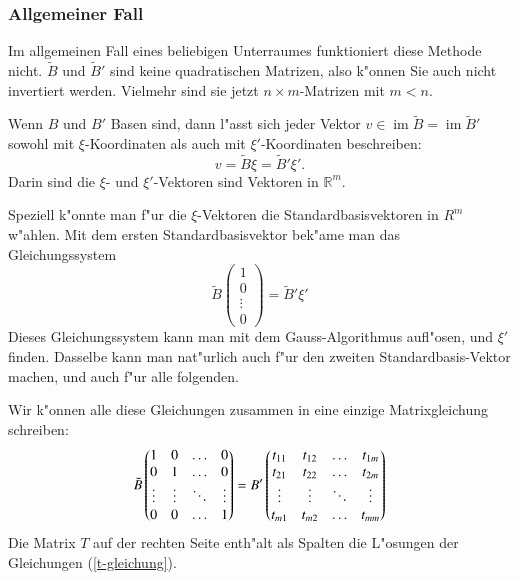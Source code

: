 \subsubsection{Allgemeiner Fall}
Im allgemeinen Fall eines beliebigen Unterraumes funktioniert diese
Methode nicht.
$\tilde B$ und $\tilde B'$ sind keine quadratischen
Matrizen, also k"onnen Sie auch nicht invertiert werden.
Vielmehr sind sie jetzt $n\times m$-Matrizen mit $m<n$.

Wenn $B$ und $B'$ Basen sind, dann l"asst sich jeder Vektor $v\in
\operatorname{im}\tilde B=\operatorname{im}\tilde B'$ 
sowohl mit $\xi$-Koordinaten als auch mit $\xi'$-Koordinaten
beschreiben:
\[
v=\tilde B\xi=\tilde B'\xi'.
\]
Darin sind die $\xi$- und $\xi'$-Vektoren sind Vektoren in $\mathbb R^m$.

Speziell k"onnte man f"ur die $\xi$-Vektoren die Standardbasisvektoren
in $R^m$ w"ahlen.
Mit dem ersten Standardbasisvektor bek"ame man
das Gleichungssystem
\begin{equation}
\tilde B\begin{pmatrix} 1\\0\\\vdots\\0\end{pmatrix}
=\tilde B'\xi'
\label{t-gleichung}
\end{equation}
Dieses Gleichungssystem kann man mit dem Gauss-Algorithmus aufl"osen,
und $\xi'$ finden.
Dasselbe kann man nat"urlich auch f"ur den
zweiten Standardbasis-Vektor machen, und auch f"ur alle folgenden.

Wir k"onnen alle diese Gleichungen zusammen in eine einzige
Matrixgleichung schreiben:
\[
\tilde B\begin{pmatrix}
1&0&\dots&0\\
0&1&\dots&0\\
\vdots&\vdots&\ddots&\vdots\\
0&0&\dots&1
\end{pmatrix}
=B'\begin{pmatrix}
\mathstrut t_{11}&t_{12}&\dots&t_{1m}\\
\mathstrut t_{21}&t_{22}&\dots&t_{2m}\\
\mathstrut \vdots&\vdots&\ddots&\vdots\\
\mathstrut t_{m1}&t_{m2}&\dots&t_{mm}\\
\end{pmatrix}
\]
Die Matrix $T$ auf der rechten Seite enth"alt als Spalten
die L"osungen der Gleichungen (\ref{t-gleichung}).

